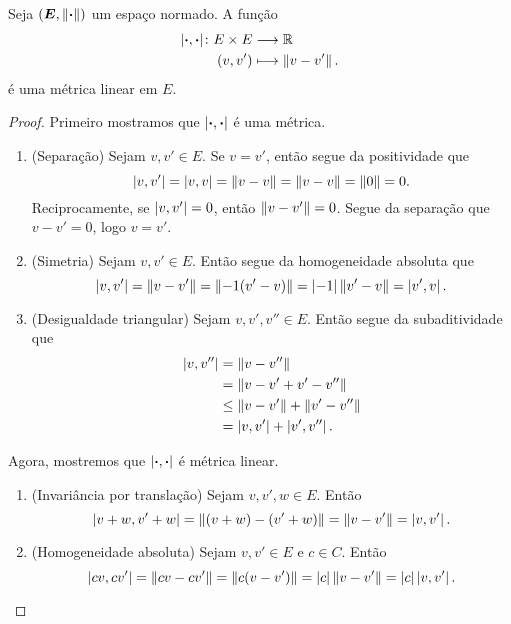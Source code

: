 \begin{proposition}
Seja $(\bm E,\left\Vert{\bm{\cdot}}\right\Vert)$ um espaço normado. A função
	\begin{align*}
	{\left\vert{\bm{\cdot}},{\bm{\cdot}}\right\vert}\colon {E \times E} &\longrightarrow {\mathbb{R}} \\{(v,v')} &\longmapsto \left\Vert{v - v'}\right\Vert.
	\end{align*}
é uma métrica linear em $E$.
\end{proposition}
\begin{proof}
Primeiro mostramos que $\left\vert{\bm{\cdot}},{\bm{\cdot}}\right\vert$ é uma métrica.
	\begin{enumerate}
	\item (Separação) Sejam $v,v' \in E$. Se $v = v'$, então segue da positividade que
	\begin{equation*}
	\left\vert{v},{v'}\right\vert = \left\vert{v},{v}\right\vert = \left\Vert{v - v}\right\Vert = \left\Vert{v-v}\right\Vert=\left\Vert{0}\right\Vert=0.
	\end{equation*}
Reciprocamente, se $\left\vert{v},{v'}\right\vert=0$, então $\left\Vert{v-v'}\right\Vert=0$. Segue da separação que $v-v'=0$, logo $v=v'$.

	\item (Simetria)  Sejam $v,v' \in E$. Então segue da homogeneidade absoluta que
	\begin{equation*}
	\left\vert{v},{v'}\right\vert=\left\Vert{v-v'}\right\Vert=\left\Vert{-1(v' - v)}\right\Vert=\left\vert{-1}\right\vert\left\Vert{v' - v}\right\Vert=\left\vert{v'},{v}\right\vert.
	\end{equation*}

	\item (Desigualdade triangular) Sejam $v,v',v'' \in E$. Então segue da subaditividade que
	\begin{align*}
	\left\vert{v},{v''}\right\vert &= \left\Vert{v-v''}\right\Vert \\
		&=\left\Vert{v-v'+v'-v''}\right\Vert \\
		&\leq \left\Vert{v-v'}\right\Vert+\left\Vert{v'-v''}\right\Vert \\
		&=\left\vert{v},{v'}\right\vert+\left\vert{v'},{v''}\right\vert.
	\end{align*}
	\end{enumerate}
Agora, mostremos que $\left\vert{\bm{\cdot}},{\bm{\cdot}}\right\vert$ é métrica linear.
	\begin{enumerate}
	\item (Invariância por translação) Sejam $v,v',w \in E$. Então
		\begin{equation*}
		\left\vert{v+w},{v'+w}\right\vert = \left\Vert{(v+w) - (v'+w)}\right\Vert = \left\Vert{v-v'}\right\Vert = \left\vert{v},{v'}\right\vert.
		\end{equation*}

	\item (Homogeneidade absoluta) Sejam $v,v' \in E$ e $c \in C$. Então
		\begin{equation*}
		\left\vert{cv},{cv'}\right\vert = \left\Vert{cv-cv'}\right\Vert = \left\Vert{c(v-v')}\right\Vert = \left\vert{c}\right\vert\left\Vert{v-v'}\right\Vert = \left\vert{c}\right\vert\left\vert{v},{v'}\right\vert. \qedhere
		\end{equation*}
	\end{enumerate}
\end{proof}

